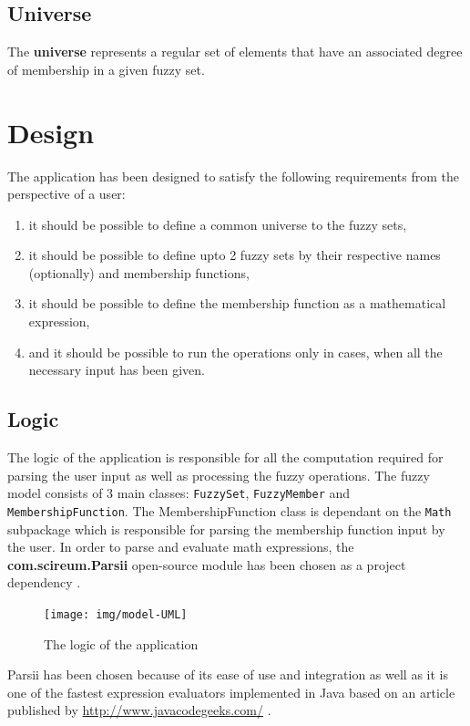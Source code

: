 \documentclass[12pt,a4paper,titlepage,final]{article}
\begin{document}
\subsection{Universe}
The \textbf{universe} represents a regular set of elements that have an associated degree of membership in a given fuzzy set.

\section{Design} \label{design}
The application has been designed to satisfy the following requirements from the perspective of a user:

\begin{enumerate}
\item it should be possible to define a common universe to the fuzzy sets,
\item it should be possible to define upto 2 fuzzy sets by their respective names (optionally) and membership functions,
\item it should be possible to define the membership function as a mathematical expression,
\item and it should be possible to run the operations only in cases, when all the necessary input has been given.
\end{enumerate}

\subsection{Logic} \label{logic}
The logic of the application is responsible for all the computation required for parsing the user input as well as processing the fuzzy operations. The fuzzy model consists of 3 main classes: \texttt{FuzzySet}, \texttt{FuzzyMember} and \texttt{MembershipFunction}. The MembershipFunction class is dependant on the \texttt{Math} subpackage which is responsible for parsing the membership function input by the user. In order to parse and evaluate math expressions, the \textbf{com.scireum.Parsii} open-source module has been chosen as a project dependency \cite{parsii}.

\noindent
\begin{figure}[h]
\centering
\texttt{[image: img/model-UML]}
\caption{The logic of the application}
\label{fig:model}
\end{figure}

Parsii has been chosen because of its ease of use and integration as well as it is one of the fastest expression evaluators implemented in Java based on an article published by \url{http://www.javacodegeeks.com/} \cite{performanceTest}.
\end{document}
